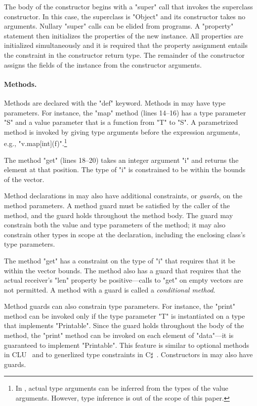 The body of the constructor
begins with a \xcd"super" call that invokes the superclass
constructor.  In this case, the superclass is
\xcd"Object" and its constructor takes no arguments.
Nullary \xcd"super" calls can be elided from \Xten programs.
A \xcd"property" statement then initializes the
properties of the new instance.  All properties are initialized
simultaneously and it is required that the property assignment
entails the constraint in the constructor return type.
The remainder of the constructor assigns the fields of the
instance from the constructor arguments.

\paragraph{Methods.}

Methods are declared with the \xcd"def" keyword.
Methods in \Xten may have type parameters.  
For instance, the \xcd"map" method (lines 14--16)
has a type parameter \xcd"S" and a value parameter that is a
function from \xcd"T" to \xcd"S".
A parametrized method is invoked by giving type arguments before the
expression arguments, e.g., \xcd"v.map[int](f)".\footnote{In \Xten, actual type
arguments can be inferred from the types of the value arguments.  However, type
inference is out of the scope of this paper.}

The method \xcd"get" (lines 18--20) takes an integer argument \xcd"i"
and returns the element at that position.  The type of \xcd"i"
is constrained to be within the bounds of the vector. 

Method declarations in \Xten
may also have additional
constraints, or \emph{guards}, on the method parameters.  A
method guard must be satisfied by the caller of the method, and
the guard holds throughout the method body.
The guard may constrain both the value and type parameters of
the method; it may also constrain other types in
scope at the declaration, including the enclosing class's type parameters.

The method \xcd"get"
has a constraint on the type of \xcd"i" that requires
that it be within the vector bounds.
The method also has a guard that
requires that the actual
receiver's
\xcd"len" property be positive---calls to \xcd"get" on empty
vectors are not permitted.
A method with a guard is called a \emph{conditional method}.

Method guards can also constrain type parameters.
For instance, the \xcd"print" method can be invoked only if
the type parameter \xcd"T" is instantiated on a type that implements
\xcd"Printable".  Since the guard holds throughout the body of the
method, the \xcd"print" method can be invoked on each element of \xcd"data"---it
is guaranteed to implement \xcd"Printable".
This feature is similar to optional methods in CLU~\cite{clu} and to generlized type constraints in C$\sharp$~\cite{emir06}.
Constructors in \Xten may also have guards.

